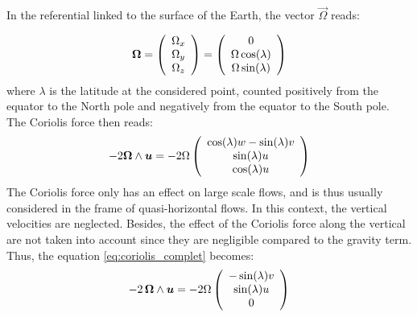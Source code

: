In the referential linked to the surface of the Earth, the vector $\vec{\Omega}$ reads:%

\begin{equation}
\vec{\Omega}=\left(
\begin{array}
[c]{c}%
\Omega_{x}\\
\Omega_{y}\\
\Omega_{z}%
\end{array}
\right)  =\left(
\begin{array}
[c]{c}%
0\\
\Omega\cos(\lambda)\\
\Omega\sin(\lambda)
\end{array}
\right)
\end{equation}
where $\lambda$ is the latitude at the considered point, counted positively
from the equator to the North pole and negatively from the equator to the South pole.
The Coriolis force then reads:
\begin{equation}\label{eq:coriolis_complet}
-2\vec{\Omega}\wedge\vec{u}=-2\Omega\left(
\begin{array}
[c]{c}%
\cos(\lambda)w-\sin(\lambda)v\\
\sin(\lambda)u\\
\cos(\lambda)u
\end{array}
\right)
\end{equation}
The Coriolis force only has an effect on large scale flows, and is thus
usually considered in the frame of quasi-horizontal flows.
In this context, the vertical velocities are neglected. Besides,
the effect of the Coriolis force along the vertical are not taken into account
since they are negligible compared to the gravity term.
Thus, the equation \eqref{eq:coriolis_complet} becomes:
\begin{equation}\label{eq:coriolis_complet}
-2\,\vec{\Omega}\wedge\vec{u}=-2\Omega\left(
\begin{array}
[c]{c}%
-\sin(\lambda)v\\
\sin(\lambda)u\\
0
\end{array}
\right)
\end{equation}

